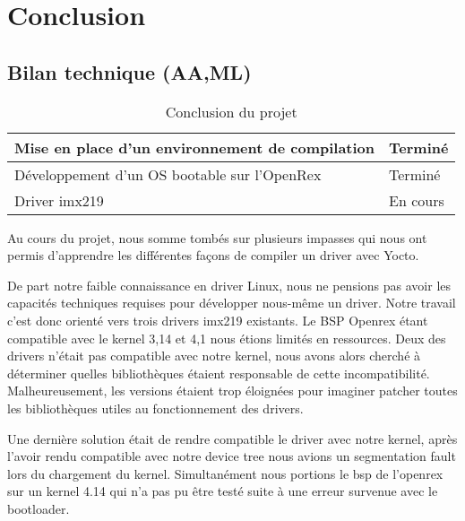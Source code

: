 
\chapter{Conclusion} %

\label{Chapter4} %


\section{Bilan technique (AA,ML)}

\begin{table}[htp]
    \centering
    \begin{tabular}{|p{}|p{}|}
        \hline
        Mise en place d'un environnement de compilation & Terminé \\ \hline
        Développement d'un OS bootable sur l'OpenRex & Terminé \\ \hline
        Driver imx219 & En cours \\ \hline
    \end{tabular}
    \caption{Conclusion du projet} \label{tab:conclusion} 
\end{table}

Au cours du projet, nous somme tombés sur plusieurs impasses qui nous ont permis
d’apprendre les différentes façons de compiler un driver avec Yocto. \medskip

De part notre faible connaissance en driver Linux, nous ne pensions pas avoir les
capacités techniques requises pour développer nous-même un driver. Notre travail c’est
donc orienté vers trois drivers imx219 existants. Le BSP Openrex étant compatible avec le
kernel 3,14 et 4,1 nous étions limités en ressources. Deux des drivers n’était pas
compatible avec notre kernel, nous avons alors cherché à déterminer quelles
bibliothèques étaient responsable de cette incompatibilité. Malheureusement, les versions
étaient trop éloignées pour imaginer patcher toutes les bibliothèques utiles au
fonctionnement des drivers.\medskip

Une dernière solution était de rendre compatible le driver avec notre kernel, après l’avoir
rendu compatible avec notre device tree nous avions un segmentation fault lors du chargement
du kernel. Simultanément nous portions le bsp de l’openrex sur un kernel 4.14 qui n’a pas pu être
testé suite à une erreur survenue avec le bootloader.\medskip

